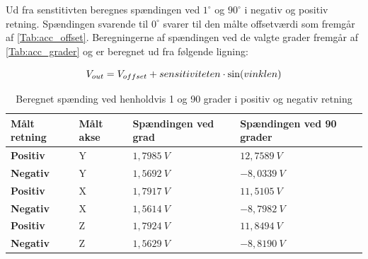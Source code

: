 Ud fra senstitivten beregnes spændingen ved $1^{\circ}$ og $90^{\circ}$ i negativ og positiv retning. Spændingen svarende til $0^{\circ}$ svarer til den målte offsetværdi som fremgår af \autoref{Tab:acc_offset}. Beregningerne af spændingen ved de valgte grader fremgår af \autoref{Tab:acc_grader} og er beregnet ud fra følgende ligning:

\begin{equation}
	V_{out} = V_{offset} + sensitiviteten \cdot \sin(vinklen) \\
\end{equation}

 \begin{table}[H]
	\centering
	\begin{tabular}{|l|l|l|l|}
	\textbf{Målt retning} & \textbf{Målt akse} & \textbf{Spændingen ved grad} & \textbf{Spændingen ved 90 grader} \\ \hline
    \textbf{Positiv} 	& Y		& $1,7985~V$   	&	$12,7589~V$\\ \hline
    \textbf{Negativ}		& Y		& $1,5692~V$  	&	$-8,0339~V$\\ \hline
    \textbf{Positiv} 	& X 		& $1,7917~V$   	& 	$11,5105~V$ \\ \hline     
    \textbf{Negativ}		& X 		& $1,5614~V$		&	$-8,7982~V$\\ \hline
    \textbf{Positiv} 	& Z 		& $1,7924~V$   	& 	$11,8494~V$	\\ \hline		
    \textbf{Negativ} 	& Z 		& $1,5629~V$		&	$-8,8190~V$ \\ \hline
	\end{tabular}
	\caption{Beregnet spænding ved henholdvis 1 og 90 grader i positiv og negativ retning}
	\label{Tab:acc_grader}
\end{table}





